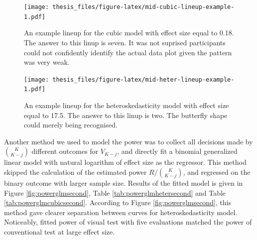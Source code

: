 \documentclass{monashthesis}
\theoremstyle{definition}
\theoremstyle{definition}
\theoremstyle{definition}
\theoremstyle{definition}
\theoremstyle{remark}
\begin{document}
\begin{figure}
\centering
\texttt{[image: thesis\_files/figure-latex/mid-cubic-lineup-example-1.pdf]}
\caption{\label{fig:mid-cubic-lineup-example}An example lineup for the cubic model with effect size equal to 0.18. The answer to this linup is seven. It was not suprised participants could not confidently identify the actual data plot given the pattern was very weak.}
\end{figure}

\begin{figure}
\centering
\texttt{[image: thesis\_files/figure-latex/mid-heter-lineup-example-1.pdf]}
\caption{\label{fig:mid-heter-lineup-example}An example lineup for the heteroskedasticity model with effect size equal to 17.5. The answer to this linup is two. The butterfly shape could merely being recognised.}
\end{figure}

Another method we used to model the power was to collect all decisions made by \(K\choose{K-j}\) different outcomes for \(V_{K-j}\), and directly fit a binomial generalized linear model with natural logarithm of effect size as the regressor. This method skipped the calculation of the estimated power \(R/{K\choose{K-j}}\), and regressed on the binary outcome with larger sample size. Results of the fitted model is given in Figure \ref{fig:powerglmsecond}, Table \ref{tab:powerglmhetersecond} and Table \ref{tab:powerglmcubicsecond}. According to Figure \ref{fig:powerglmsecond}, this method gave clearer separation between curves for heteroskedasticity model. Noticeably, fitted power of visual test with five evaluations matched the power of conventional test at large effect size.
\end{document}

